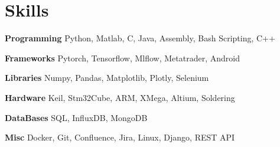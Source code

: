 
\section{Skills}
  \vspace{2pt}
  \resumeSubHeadingListStart
    \small{\item{

    \textbf{Programming}{ Python, Matlab, C, Java, Assembly, Bash Scripting, C++} \\ \vspace{3pt}

    \textbf{Frameworks}{ Pytorch, Tensorflow, Mlflow, Metatrader, Android} \\ \vspace{3pt}

    \textbf{Libraries}{ Numpy, Pandas, Matplotlib, Plotly, Selenium} \\ \vspace{3pt}

    \textbf{Hardware}{ Keil, Stm32Cube, ARM, XMega, Altium, Soldering} \\ \vspace{3pt}

    \textbf{DataBases}{ SQL, InfluxDB, MongoDB} \\ \vspace{3pt}

    \textbf{Misc}{ Docker, Git, Confluence, Jira, Linux, Django, REST API} \\ \vspace{3pt}
            
    }}
  \resumeSubHeadingListEnd
